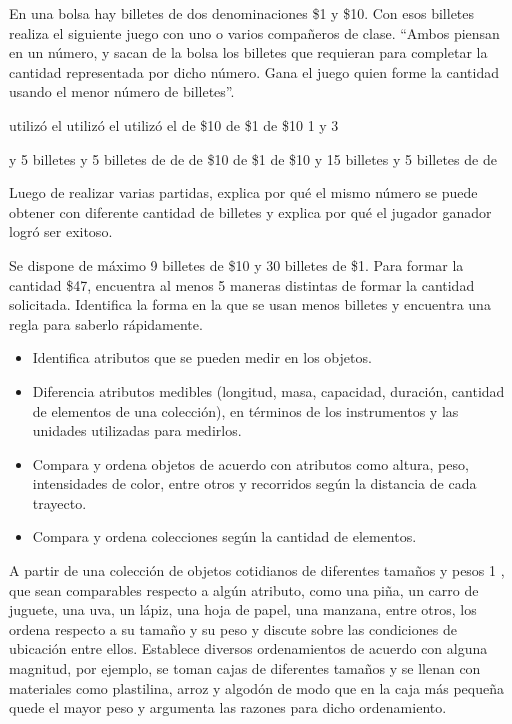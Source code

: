 \ejemplo

En una bolsa hay billetes de dos denominaciones \$1 y \$10. Con esos billetes realiza el siguiente juego con uno o varios compañeros de clase. “Ambos piensan en un número, y sacan de la bolsa los billetes que requieran para completar la cantidad representada por dicho número. Gana el juego quien forme la cantidad usando el menor número de billetes”.

utilizó el utilizó el utilizó el de \$10 de \$1 de \$10 1 y 3


y 5 billetes y 5 billetes de de de \$10 de \$1 de \$10 y 15 billetes y 5 billetes de de

Luego de realizar varias partidas, explica por qué el mismo número se puede obtener con diferente cantidad de billetes y explica por qué el jugador ganador logró ser exitoso.

Se dispone de máximo 9 billetes de \$10 y 30 billetes de \$1. Para formar la cantidad \$47, encuentra al menos 5 maneras distintas de formar la cantidad solicitada. Identifica la forma en la que se usan menos billetes y encuentra una regla para saberlo rápidamente.


\evidencias

\begin{itemize}
  \item Identifica atributos que se pueden medir en los objetos.
  \item Diferencia atributos medibles (longitud, masa, capacidad, duración, cantidad de elementos de una colección), en términos de los instrumentos y las unidades utilizadas para medirlos.
  \item Compara y ordena objetos de acuerdo con atributos como altura, peso, intensidades de color, entre otros y recorridos según la distancia de cada trayecto.
  \item Compara y ordena colecciones según la cantidad de elementos.
\end{itemize}

\ejemplo

A partir de una colección de objetos cotidianos de diferentes tamaños y pesos 1 , que sean comparables respecto a algún atributo, como una piña, un carro de juguete, una uva, un lápiz, una hoja de papel, una manzana, entre otros, los ordena respecto a su tamaño y su peso y discute sobre las condiciones de ubicación entre ellos. Establece diversos ordenamientos de acuerdo con alguna magnitud, por ejemplo, se toman cajas de diferentes tamaños y se llenan con materiales como plastilina, arroz y algodón de modo que en la caja más pequeña quede el mayor peso y argumenta las razones para dicho ordenamiento.

